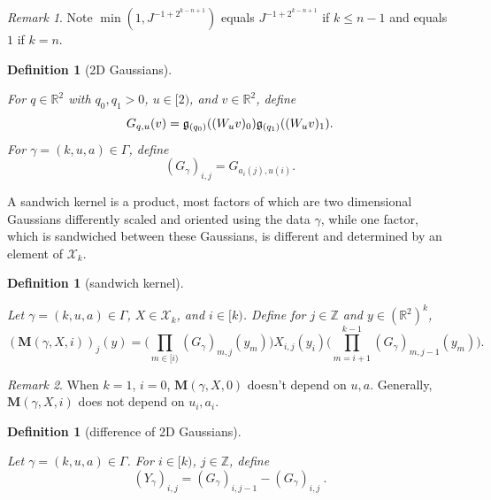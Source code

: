 \documentclass[12pt,reqno]{amsart}
\theoremstyle{plain}
\newtheorem{definition}[theorem]{Definition}
\numberwithin{equation}{section}
\theoremstyle{remark}
\newtheorem{rem}{Remark}[section]
\newcommand{\uses}[1]{}
\newcommand{\usesdefs}[1]{}
\newcommand{\lean}[1]{}
\newcommand{\Z}{{\mathbb Z}}
\newcommand{\R}{{\mathbb R}}
\newcommand{\M}{\mathbf{M}}
\begin{document}
\begin{rem}
Note $\min(1,J^{-1+2^{k-n+1}})$ equals $J^{-1+2^{k-n+1}}$ if $k\le n-1$ and equals $1$ if $k=n$.
\end{rem}


\begin{definition}[2D Gaussians]\label{2D Gaussians}\uses{}\usesdefs{gaussian,geometric parameters,auto:unitary-matrices-definition}
\lean{Auto.twoDimensionalGaussian,Auto.gammaGaussian}
For $q\in\R^2$ with $q_0,q_1>0$, $u\in[2)$, and $v\in\mathbb R^2$, define
\begin{equation}\label{auto:rotated-Gaussian-kernel} G_{q,u}(v) = \mathfrak{g}_{(q_0)}((W_u v)_0) \mathfrak{g}_{(q_1)}((W_u v)_1). \end{equation}
For $\gamma=(k,u,a)\in \Gamma$, define
\begin{equation}\label{auto:sandwich-Gaussian-factor} (G_{\gamma})_{i,j} = G_{a_i(j),u(i)}. \end{equation}
\end{definition}


A sandwich kernel is a product, most factors of which are two dimensional Gaussians differently scaled and oriented
using the data $\gamma$, while one
factor, which is  sandwiched between these Gaussians, is different and determined by an element of $\mathcal{X}_k$.
\begin{definition}[sandwich kernel]\label{sandwich kernel}\uses{}\usesdefs{geometric parameters,double sequence of 2D functions,2D Gaussians}
\lean{Auto.sandwichKernel}
Let $\gamma=(k,u,a)\in \Gamma$, $X\in \mathcal{X}_k$, and $i\in [k)$. Define for  $j\in \Z$ and $y\in (\R^{2})^k$,
\begin{equation}\label{auto:sandwich-kernel-definition} (\M(\gamma,X,i))_j(y) =  \Big(\prod_{m\in [i)} (G_{\gamma})_{m,j}(y_m) \Big) X_{i,j}(y_i) \Big(\prod_{m=i+1}^{k-1} (G_{\gamma})_{m,j-1}(y_m) \Big).\end{equation}
\end{definition}

\begin{rem}
When $k=1$, $i=0$, $\M(\gamma,X,0)$ doesn't depend on $u,a$.
Generally, $\M(\gamma,X,i)$ does not depend on $u_i, a_i$.
\end{rem}

\begin{definition}[difference of 2D Gaussians]\label{auto:Gaussian-difference-kernel-definition}\uses{}\usesdefs{geometric parameters,2D Gaussians}
\lean{Auto.gaussianDifference}
Let $\gamma=(k,u,a)\in \Gamma$.  For $i\in [k)$, $j\in \Z$, define
\begin{equation}\label{auto:Gaussian-difference-kernel} (Y_\gamma)_{i,j} = (G_\gamma)_{i,j-1} - (G_\gamma)_{i,j}\ .\end{equation}
\end{definition}
\end{document}
